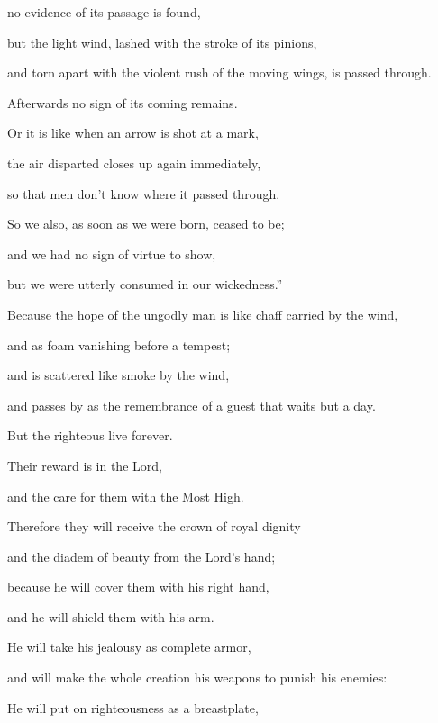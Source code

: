{\par }{\QB no evidence of its passage is found,
\par }{\QB but the light wind, lashed with the stroke of its pinions,
\par }{\QB and torn apart with the violent rush of the moving wings, is passed through.
\par }{\QB Afterwards no sign of its coming remains.
\par }{\Q {}Or it is like when an arrow is shot at a mark,
\par }{\QB the air disparted closes up again immediately,
\par }{\QB so that men don’t know where it passed through.
\par }{\Q {}So we also, as soon as we were born, ceased to be;
\par }{\QB and we had no sign of virtue to show,
\par }{\QB but we were utterly consumed in our wickedness.”
\par }{\Q {}Because the hope of the ungodly man is like chaff carried by the wind,
\par }{\QB and
 as
 foam vanishing before a tempest;
\par }{\QB and is scattered like smoke by the wind,
\par }{\QB and passes by as the remembrance of a guest that waits but a day.
\par }{\BB \par }{\Q {}But the righteous live forever.
\par }{\QB Their reward is in the Lord,
\par }{\QB and the care for them with the Most High.
\par }{\Q {}Therefore they will receive the crown of royal dignity
\par }{\QB and the diadem of beauty from the Lord’s hand;
\par }{\Q because he will cover them with his right hand,
\par }{\QB and he will shield them with his arm.
\par }{\Q {}He will take his jealousy as complete armor,
\par }{\QB and will make the whole creation his weapons to punish his enemies:
\par }{\Q {}He will put on righteousness as a breastplate,
}
